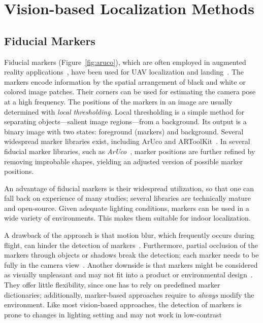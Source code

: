 \documentclass{report}
\begin{document}
\section{Vision-based Localization Methods}

\subsection{Fiducial Markers}
\label{sec:fiducialmarkers}

Fiducial markers (Figure~\ref{fig:aruco}), which are often employed in
augmented reality
applications~\cite{kato1999marker,garrido2014automatic}, have been
used for UAV localization and
landing~\cite{eberli2011vision,bebop2015}. The markers encode
information by the spatial arrangement of black and white or colored
image patches. Their corners can be used for estimating the camera
pose at a high frequency. The positions of the markers in an image are
usually determined with \emph{local thresholding}. Local thresholding
is a simple method for separating objects---salient image
regions---from a background. Its output is a binary image with two
states: foreground (markers) and background. Several widespread marker
libraries exist, including ArUco and
ARToolKit~\cite{kato1999marker}. In several fiducial marker libraries,
such as \emph{ArUco}~\cite{aruco2014}, marker positions are further
refined by removing improbable shapes, yielding an adjusted version of
possible marker positions.

An advantage of fiducial markers is their widespread utilization, so
that one can fall back on experience of many studies; several
libraries are technically mature and open-source. Given adequate
lighting conditions, markers can be used in a wide variety of
environments. This makes them suitable for indoor localization.

A drawback of the approach is that motion blur, which frequently
occurs during flight, can hinder the detection of
markers~\cite{albasiouny2015mean}. Furthermore, partial occlusion of
the markers through objects or shadows break the detection; each
marker needs to be fully in the camera
view~\cite{hornecker2005using}. Another downside is that markers might
be considered as visually unpleasant and may not fit into a product or
environmental design~\cite{chu2013halftone}. They offer little
flexibility, since one has to rely on predefined marker dictionaries;
additionally, marker-based approaches require to \emph{always} modify
the environment. Like most vision-based approaches, the detection of
markers is prone to changes in lighting setting and may not work in
low-contrast
\end{document}
